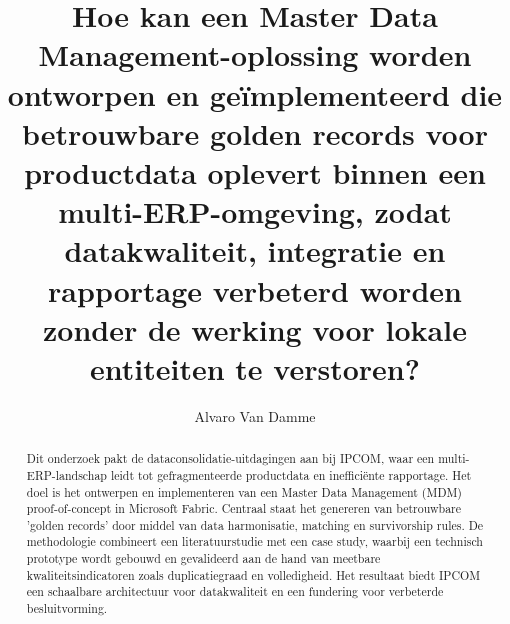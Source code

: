\documentclass{hogent-article}
\title{Hoe kan een Master Data Management-oplossing worden ontworpen en geïmplementeerd die betrouwbare golden records voor productdata oplevert binnen een multi-ERP-omgeving, zodat datakwaliteit, integratie en rapportage verbeterd worden zonder de werking voor lokale entiteiten te verstoren?}
\author{Alvaro Van Damme}
\begin{document}
\begin{abstract}
Dit onderzoek pakt de dataconsolidatie-uitdagingen aan bij IPCOM, waar een multi-ERP-landschap leidt tot gefragmenteerde productdata en inefficiënte rapportage. Het doel is het ontwerpen en implementeren van een Master Data Management (MDM) proof-of-concept in Microsoft Fabric. Centraal staat het genereren van betrouwbare 'golden records' door middel van data harmonisatie, matching en survivorship rules. De methodologie combineert een literatuurstudie met een case study, waarbij een technisch prototype wordt gebouwd en gevalideerd aan de hand van meetbare kwaliteitsindicatoren zoals duplicatiegraad en volledigheid. Het resultaat biedt IPCOM een schaalbare architectuur voor datakwaliteit en een fundering voor verbeterde besluitvorming.
\end{abstract}

\tableofcontents



\printbibliography[heading=bibintoc]
\end{document}
